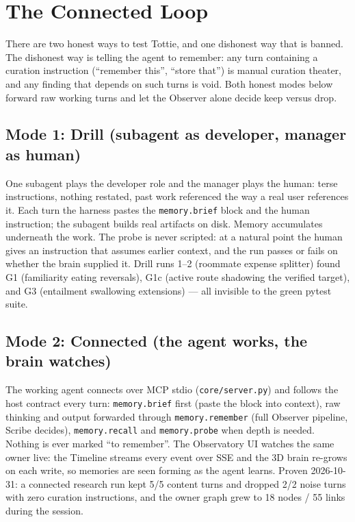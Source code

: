 \chapter{The Connected Loop}
\label{ch:connected-loop}

There are two honest ways to test Tottie, and one dishonest way that is
banned. The dishonest way is telling the agent to remember: any turn
containing a curation instruction (``remember this'', ``store that'') is
manual curation theater, and any finding that depends on such turns is
void. Both honest modes below forward raw working turns and let the
Observer alone decide keep versus drop.

\section{Mode 1: Drill (subagent as developer, manager as human)}

One subagent plays the developer role and the manager plays the human:
terse instructions, nothing restated, past work referenced the way a
real user references it. Each turn the harness pastes the
\verb|memory.brief| block and the human instruction; the subagent builds
real artifacts on disk. Memory accumulates underneath the work. The
probe is never scripted: at a natural point the human gives an
instruction that assumes earlier context, and the run passes or fails on
whether the brain supplied it. Drill runs 1--2 (roommate expense
splitter) found G1 (familiarity eating reversals), G1c (active route
shadowing the verified target), and G3 (entailment swallowing
extensions) --- all invisible to the green pytest suite.

\section{Mode 2: Connected (the agent works, the brain watches)}

The working agent connects over MCP stdio (\verb|core/server.py|) and
follows the host contract every turn: \verb|memory.brief| first (paste
the block into context), raw thinking and output forwarded through
\verb|memory.remember| (full Observer pipeline, Scribe decides),
\verb|memory.recall| and \verb|memory.probe| when depth is needed.
Nothing is ever marked ``to remember''. The Observatory UI watches the
same owner live: the Timeline streams every event over SSE and the 3D
brain re-grows on each write, so memories are seen forming as the agent
learns. Proven 2026-10-31: a connected research run kept 5/5 content
turns and dropped 2/2 noise turns with zero curation instructions, and
the owner graph grew to 18 nodes / 55 links during the session.


